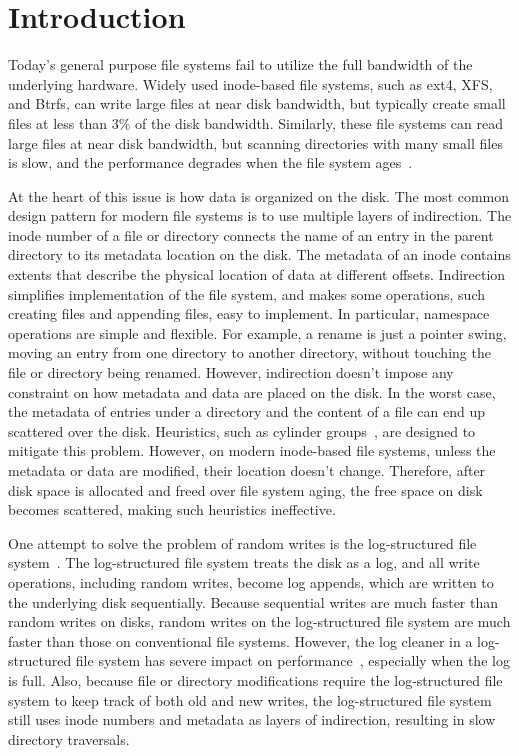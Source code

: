 \chapter{Introduction}
\label{chap:intro}

Today's general purpose file systems fail to utilize the full bandwidth of the
underlying hardware.
Widely used inode-based file systems, such as ext4, XFS, and Btrfs, can write
large files at near disk bandwidth,
but typically create small files at less than 3\% of the disk bandwidth.
Similarly, these file systems can read large files at near disk bandwidth,
but scanning directories with many small files is slow, and the performance
degrades when the file system ages~\citep{betrfs3}.

At the heart of this issue is how data is organized on the disk.
The most common design pattern for modern file systems is to use multiple layers
of indirection.
The inode number of a file or directory connects the name of an entry in the
parent directory to its metadata location on the disk.
The metadata of an inode contains extents that describe the physical location
of data at different offsets.
Indirection simplifies implementation of the file system, and makes some
operations, such creating files and appending files, easy to implement.
In particular, namespace operations are simple and flexible.
For example, a rename is just a pointer swing, moving an entry from one
directory to another directory, without touching the file or directory being
renamed.
However, indirection doesn't impose any constraint on how metadata and data
are placed on the disk.
In the worst case, the metadata of entries under a directory and the content of
a file can end up scattered over the disk.
Heuristics, such as cylinder groups~\citep{ffs1}, are designed to mitigate this
problem.
However, on modern inode-based file systems, unless the metadata or data are
modified, their location doesn't change.
Therefore, after disk space is allocated and freed over file system aging,
the free space on disk becomes scattered, making such heuristics ineffective.

One attempt to solve the problem of random writes is the log-structured file
system~\citep{lfs}.
The log-structured file system treats the disk as a log,
and all write operations, including random writes, become log appends,
which are written to the underlying disk sequentially.
Because sequential writes are much faster than random writes on disks,
random writes on the log-structured file system are much faster than those on
conventional file systems.
However, the log cleaner in a log-structured file system has severe impact on
performance~\citep{lfsbsd}, especially when the log is full.
Also, because file or directory modifications require the log-structured file
system to keep track of both old and new writes,
the log-structured file system still uses inode numbers and metadata as
layers of indirection, resulting in slow directory traversals.

